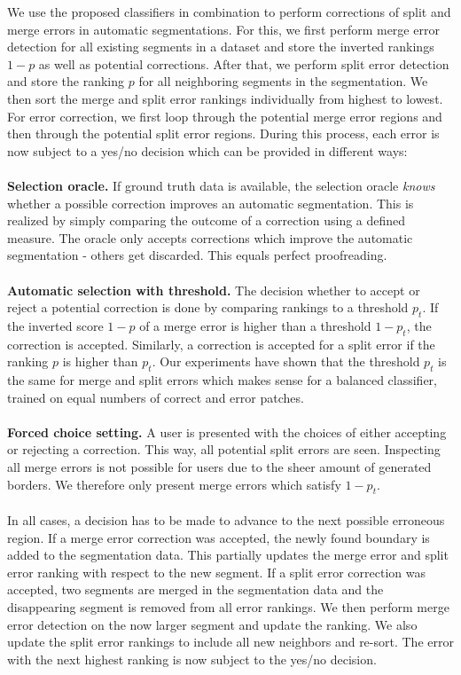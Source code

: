 We use the proposed classifiers in combination to perform corrections of split and merge errors in automatic segmentations. For this, we first perform merge error detection for all existing segments in a dataset and store the inverted rankings $1-p$ as well as potential corrections. After that, we perform split error detection and store the ranking $p$ for all neighboring segments in the segmentation. We then sort the merge and split error rankings individually from highest to lowest. 
For error correction, we first loop through the potential merge error regions and then through the potential split error regions. During this process, each error is now subject to a yes/no decision which can be provided in different ways: 
\\~\\
\textbf{Selection oracle.} If ground truth data is available, the selection oracle \textit{knows} whether a possible correction improves an automatic segmentation. This is realized by simply comparing the outcome of a correction using a defined measure. The oracle only accepts corrections which improve the automatic segmentation - others get 
discarded. This equals perfect proofreading.
\\~\\
\textbf{Automatic selection with threshold.} The decision whether to accept or reject a potential correction is done by comparing rankings to a threshold $p_t$. If the inverted score $1-p$ of a merge error is higher than a threshold $1-p_t$, the correction is accepted. Similarly, a correction is accepted for a split error if the ranking $p$ is higher than $p_t$. Our experiments have shown that the threshold $p_t$ is the same for merge and split errors which makes sense for a balanced classifier, trained on equal numbers of correct and error patches.
\\~\\
\textbf{Forced choice setting.} A user is presented with the choices of either accepting or rejecting a correction. This way, all potential split errors are seen. Inspecting all merge errors is not possible for users due to the sheer amount of generated borders. We therefore only present merge errors which satisfy $1-p_t$. 
\\~\\
In all cases, a decision has to be made to advance to the next possible erroneous region. If a merge error correction was accepted, the newly found boundary is added to the segmentation data. This partially updates the merge error and split error ranking with respect to the new segment. If a split error correction was accepted, two segments are merged in the segmentation data and the disappearing segment is removed from all error rankings. We then perform merge error detection on the now larger segment and update the ranking. We also update the split error rankings to include all new neighbors and re-sort. The error with the next highest ranking is now subject to the yes/no decision.

